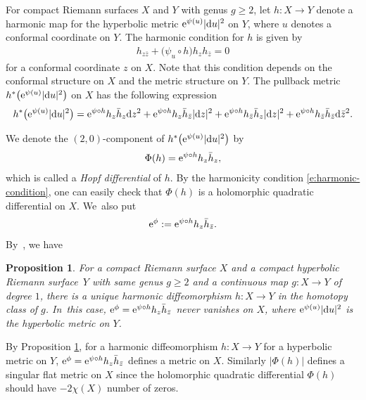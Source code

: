 \documentclass[10pt,a4paper]{amsart}
\numberwithin{equation}{section}
\newtheorem{Proposition}[Theorem]{Proposition}
 { \theoremstyle{definition}
\newtheorem{Remark}[Theorem]{Remark} }
\begin{document}
For compact Riemann surfaces $X$ and $Y$ with genus $g\geq 2$, let $h\colon X\to Y$ denote a harmonic map for the hyperbolic metric ${\rm e}^{\psi(u)} |{\rm d}u|^2$ on $Y$, where $u$ denotes a conformal coordinate on $Y$.
The harmonic condition for $h$ is given by
\begin{gather}\label{e:harmonic-condition}
h_{z\bar{z}}+\big(\psi_u\circ h \big) h_z h_{\bar{z}}=0
\end{gather}
for a conformal coordinate $z$ on $X$.
Note that this condition depends on the conformal structure on $X$ and the metric structure on $Y$.
The pullback metric $h^*\big( {\rm e}^{\psi(u)} |{\rm d}u|^2\big)$ on $X$ has the following expression
\begin{gather}\label{e:pullback-metric}
h^*\big( {\rm e}^{\psi(u)} |{\rm d}u|^2\big) = {\rm e}^{\psi\circ h} h_z \bar{h}_z {\rm d}z^2 + {\rm e}^{\psi\circ h} h_z \bar{h}_{\bar{z}} |{\rm d}z|^2 + {\rm e}^{\psi\circ h} h_{\bar{z}} \bar{h}_z |{\rm d}z|^2 + {\rm e}^{\psi\circ h} h_{\bar{z}} \bar{h}_{\bar{z}} {\rm d}\bar{z}^2.
\end{gather}

We denote the $(2,0)$-component of $h^*\big( {\rm e}^{\psi(u)} |{\rm d}u|^2\big)$ by
\begin{gather*}
\Phi(h)={\rm e}^{\psi\circ h} h_z \bar{h}_z,
\end{gather*}
which is called a \emph{Hopf differential} of $h$. By the harmonicity condition \eqref{e:harmonic-condition}, one can easily check that $\Phi(h)$ is a holomorphic quadratic differential on $X$. We~also put
\begin{gather*}%
{\rm e}^{\phi}:= {\rm e}^{\psi\circ h} h_z \bar{h}_{\bar{z}}.
\end{gather*}
By~\cite[Theorem 3.10.1 and Corollary 3.10.1]{J}, we have

\begin{Proposition}\label{p:property-har}
For a compact Riemann surface $X$ and a compact hyperbolic Riemann surface~$Y$ with same genus $g\ge 2$ and a continuous map $g\colon X\to Y$ of degree $1$,
there is a unique harmonic diffeomorphism $h\colon X\to Y$ in the homotopy class of $g$. In~this case,
${\rm e}^{\phi}= {\rm e}^{\psi\circ h} h_z \bar{h}_{\bar{z}}$ never vanishes on $X$, where ${\rm e}^{\psi(u)} |{\rm d}u|^2$ is the hyperbolic metric on $Y$.
\end{Proposition}

By Proposition \ref{p:property-har}, for a harmonic diffeomorphism $h\colon X\to Y$ for a hyperbolic metric on $Y$, ${\rm e}^\phi={\rm e}^{\psi\circ h} h_z \bar{h}_{\bar{z}}$ defines a metric on $X$.
Similarly $|\Phi(h)|$ defines a singular flat metric on $X$ since the holomorphic quadratic differential $\Phi(h)$ should have $-2\chi(X)$ number of zeros.
\end{document}
